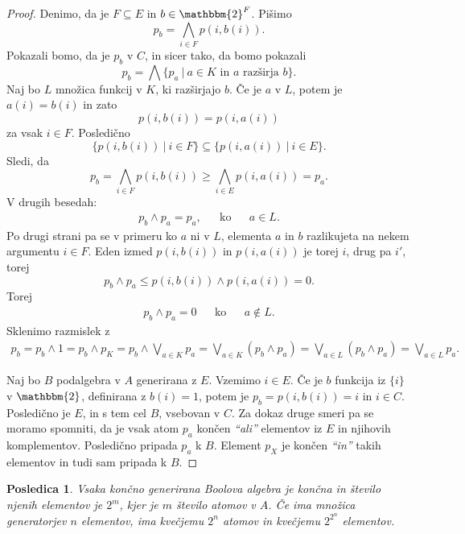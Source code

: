 \documentclass{amsart}
\newtheorem{posledica}[izrek]{Posledica}
\begin{document}
\begin{proof}
    \noindent Denimo, da je \(F \subseteq E\) in $b \in \mathbbm{2}^{F}$. Pišimo
    \[p_b = \bigwedge_{i\in F} p(i,b(i)).\]
    Pokazali bomo, da je $p_b$ v $C$, in sicer tako, da bomo pokazali
    \[p_b = \bigwedge \{p_a~|~a\in K \text{ in } a \text{ razširja } b\}.\]
    Naj bo $L$ množica funkcij v $K$, ki razširjajo $b$. Če je $a$ v $L$, potem je 
    \(a(i) = b(i)\) in zato
    \[p(i,b(i)) = p(i,a(i))\]
    za vsak $i \in F$. Posledično
    \[\{p(i,b(i))~|~i\in F\} \subseteq \{p(i,a(i))~|~i\in E\}.\]
    Sledi, da 
    \[p_b = \bigwedge_{i\in F} p(i,b(i)) \geq \bigwedge_{i\in E} p(i,a(i)) = p_a.\]
    V drugih besedah:
    \begin{align*}
        p_b \wedge p_a = p_a, && \text{ko} && a\in L. 
    \end{align*}
    Po drugi strani pa se v primeru ko $a$ ni v $L$, elementa $a$ in $b$ razlikujeta na nekem argumentu
    $i \in F$. Eden izmed $p(i,b(i))$ in $p(i,a(i))$ je torej $i$, drug pa $i'$, torej
    \[p_b \wedge p_a \leq p(i,b(i)) \wedge p(i,a(i)) = 0.\]
    Torej 
    \begin{align*}
        p_b \wedge p_a = 0 && \text{ko} && a\notin L. 
    \end{align*}
    Sklenimo razmislek z
    \begin{multline*}
        p_b = p_b \wedge 1 = p_b \wedge p_K = p_b \wedge \bigvee_{a \in K} p_a
        = \bigvee_{a \in K} (p_b \wedge p_a) = \bigvee_{a \in L} (p_b \wedge p_a)
        = \bigvee_{a \in L} p_a.
    \end{multline*}

    \noindent Naj bo $B$ podalgebra v $A$ generirana z $E$. Vzemimo $i \in E$. Če je 
    $b$ funkcija iz $\{i\}$ v $\mathbbm{2}$, definirana z $b(i) = 1$, potem je
    $p_b = p(i, b(i)) = i$ in $i\in C$. Posledično je $E$, in s tem cel $B$, vsebovan v $C$.
    Za dokaz druge smeri pa se moramo spomniti, da je vsak atom $p_a$ končen \textit{``ali''}
    elementov iz $E$ in njihovih komplementov. Posledično pripada $p_a$ k $B$. Element
    \(p_X\) je končen \textit{``in''} takih elementov in tudi sam pripada k $B$.
\end{proof}

\begin{posledica}
    Vsaka končno generirana Boolova algebra  je končna in število njenih elementov je 
    $2^m$, kjer je $m$ število atomov v $A$. Če ima množica generatorjev $n$ elementov, 
    ima kvečjemu $2^n$ atomov in kvečjemu $2^{2^n}$ elementov.
\end{posledica}
\end{document}
